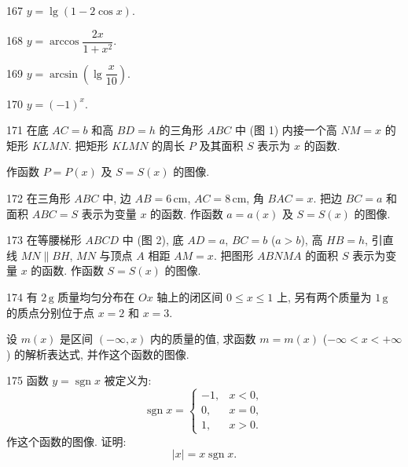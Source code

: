 \begin{prob}[S]{167}
$y = \lg(1 - 2\cos x)$.
\end{prob}

\begin{prob}[S]{168}
$y = \arccos\dfrac{2x}{1 + x^2}$.
\end{prob}

\begin{prob}[S]{169}
$y = \arcsin\left(\lg\dfrac{x}{10}\right)$.
\end{prob}

\begin{prob}[S]{170}
$y = (-1)^x$.
\end{prob}

\begin{prob}[L]{171}
在底 $AC = b$ 和高 $BD = h$ 的三角形 $ABC$ 中 (图 1) 内接一个高 $NM = x$ 的矩形 $KLMN$. 把矩形 $KLMN$ 的周长 $P$ 及其面积 $S$ 表示为 $x$ 的函数.

作函数 $P = P(x)$ 及 $S = S(x)$ 的图像.
\end{prob}

\begin{prob}[L]{172}
在三角形 $ABC$ 中, 边 $AB = 6\,\mathrm{cm}$, $AC = 8\,\mathrm{cm}$, 角 $BAC = x$. 把边 $BC = a$ 和面积 $ABC = S$ 表示为变量 $x$ 的函数. 作函数 $a = a(x)$ 及 $S = S(x)$ 的图像.
\end{prob}

\begin{prob}[L]{173}
在等腰梯形 $ABCD$ 中 (图 2), 底 $AD = a$, $BC = b$ ($a > b$), 高 $HB = h$, 引直线 $MN \parallel BH$, $MN$ 与顶点 $A$ 相距 $AM = x$. 把图形 $ABNMA$ 的面积 $S$ 表示为变量 $x$ 的函数. 作函数 $S = S(x)$ 的图像.
\end{prob}

\begin{prob}[L]{174}
有 $2\,\mathrm{g}$ 质量均匀分布在 $Ox$ 轴上的闭区间 $0 \leqslant x \leqslant 1$ 上, 另有两个质量为 $1\,\mathrm{g}$ 的质点分别位于点 $x = 2$ 和 $x = 3$.

设 $m(x)$ 是区间 $(-\infty, x)$ 内的质量的值, 求函数 $m = m(x)$ ($-\infty < x < +\infty$) 的解析表达式, 并作这个函数的图像.
\end{prob}

\begin{prob}[M]{175}
函数 $y = \operatorname{sgn} x$ 被定义为:
\[
\operatorname{sgn} x = \begin{cases}
-1, & x < 0, \\
0, & x = 0, \\
1, & x > 0.
\end{cases}
\]
作这个函数的图像. 证明:
\[
|x| = x \operatorname{sgn} x.
\]
\end{prob}

